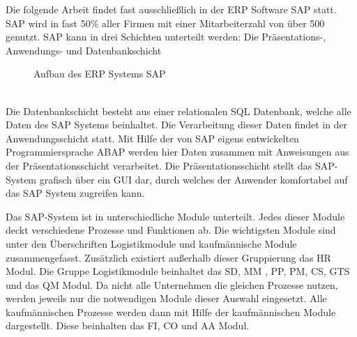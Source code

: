 Die folgende Arbeit findet fast ausschließlich in der \ac{ERP} Software SAP statt. SAP wird in fast 50\% aller Firmen mit einer Mitarbeiterzahl von \"{u}ber 500 genutzt.
SAP kann in drei Schichten unterteilt werden: Die Pr\"{a}sentations-, Anwendungs- und Datenbankschicht \\
\begin{figure}[ht]
	\centering
	
	
	\caption{Aufbau des ERP Systems SAP}
	\label{fig2}
	
\end{figure}
\\
Die Datenbankschicht besteht aus einer relationalen SQL Datenbank, welche alle Daten des SAP Systems beinhaltet. Die Verarbeitung dieser Daten findet in der Anwendungsschicht statt. Mit Hilfe der von SAP eigens entwickelten Programmiersprache \ac{ABAP} werden hier Daten zusammen mit Anweisungen aus der Pr\"{a}sentationsschicht verarbeitet. Die Pr\"{a}sentationsschicht stellt das SAP-System grafisch \"{u}ber ein \ac{GUI} dar, durch welches der Anwender komfortabel auf das SAP System zugreifen kann. \medskip 

Das SAP-System ist in unterschiedliche Module unterteilt. Jedes dieser Module deckt verschiedene Prozesse und Funktionen ab. Die wichtigsten Module sind unter den \"{U}berschriften Logistikmodule und kaufm\"{a}nnische Module zusammengefasst. Zus\"{a}tzlich existiert außerhalb dieser Gruppierung das \ac{HR} Modul. 
Die Gruppe Logistikmodule beinhaltet das \ac{SD}, \ac{MM} , \ac{PP}, \ac{PM}, \ac{CS}, \ac{GTS} und das \ac{QM} Modul. Da nicht alle Unternehmen die gleichen Prozesse nutzen, werden jeweils nur die notwendigen Module dieser Auswahl eingesetzt. 
Alle kaufm\"{a}nnischen Prozesse werden dann mit Hilfe der kaufm\"{a}nnischen Module dargestellt. Diese beinhalten das \ac{FI}, \ac{CO} und \ac{AA} Modul.

